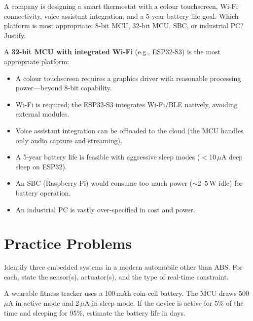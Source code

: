 \begin{example}
A company is designing a smart thermostat with a colour touchscreen, Wi-Fi connectivity, voice assistant integration, and a 5-year battery life goal. Which platform is most appropriate: 8-bit MCU, 32-bit MCU, SBC, or industrial PC? Justify.

\begin{solution}
A \textbf{32-bit MCU with integrated Wi-Fi} (e.g., ESP32-S3) is the most appropriate platform:

\begin{itemize}[nosep]
  \item A colour touchscreen requires a graphics driver with reasonable processing power---beyond 8-bit capability.
  \item Wi-Fi is required; the ESP32-S3 integrates Wi-Fi/BLE natively, avoiding external modules.
  \item Voice assistant integration can be offloaded to the cloud (the MCU handles only audio capture and streaming).
  \item A 5-year battery life is feasible with aggressive sleep modes ($<$10\,$\mu$A deep sleep on ESP32).
  \item An SBC (Raspberry Pi) would consume too much power ($\sim$2--5\,W idle) for battery operation.
  \item An industrial PC is vastly over-specified in cost and power.
\end{itemize}
\end{solution}
\end{example}

\section{Practice Problems}
\label{sec:intro:practice}

\begin{exercise}
Identify three embedded systems in a modern automobile other than ABS. For each, state the sensor(s), actuator(s), and the type of real-time constraint.
\end{exercise}

\begin{exercise}
A wearable fitness tracker uses a 100\,mAh coin-cell battery. The MCU draws 500\,$\mu$A in active mode and 2\,$\mu$A in sleep mode. If the device is active for 5\% of the time and sleeping for 95\%, estimate the battery life in days.
\end{exercise}

